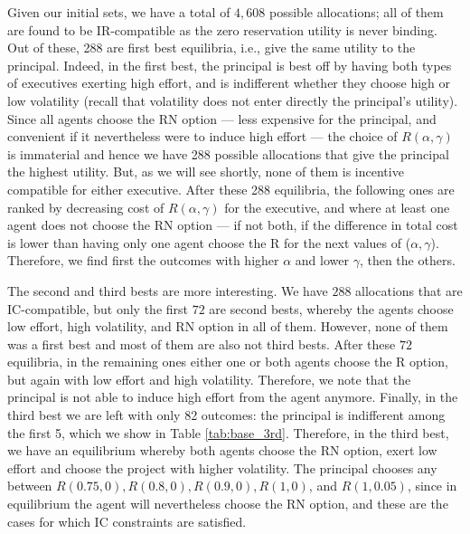 Given our initial sets, we have a total of $4,608$ possible allocations; all of them are found to be IR-compatible as the zero reservation utility is never binding. Out of these, 288 are first best equilibria, i.e., give the same utility to the principal. Indeed, in the first best, the principal is best off by having both types of executives exerting high effort, and is indifferent whether they choose high or low volatility (recall that volatility does not enter directly the principal's utility). Since all agents choose the RN option --- less expensive for the principal, and convenient if it nevertheless were to induce high effort --- the choice of $R(\alpha, \gamma)$ is immaterial and hence we have 288 possible allocations that give the principal the highest utility. But, as we will see shortly, none of them is incentive compatible for either executive. After these 288 equilibria, the following ones are ranked by decreasing cost of $R(\alpha, \gamma)$ for the executive, and where at least one agent does not choose the RN option --- if not both, if the difference in total cost is lower than having only one agent choose the R for the next values of ($\alpha, \gamma$). Therefore, we find first the outcomes with higher $\alpha$ and lower $\gamma$, then the others.



The second and third bests are more interesting. We have $288$ allocations that are IC-compatible, but only the first $72$ are second bests, whereby the agents choose low effort, high volatility, and RN option in all of them. However, none of them was a first best and most of them are also not third bests. After these $72$ equilibria, in the remaining ones either one or both agents choose the R option, but again with low effort and high volatility. Therefore, we note that the principal is not able to induce high effort from the agent anymore. Finally, in the third best we are left with only 82 outcomes: the principal is indifferent among the first 5, which we show in Table \ref*{tab:base_3rd}. Therefore, in the third best, we have an equilibrium whereby both agents choose the RN option, exert low effort and choose the project with higher volatility. The principal chooses any between $R(0.75, 0), R(0.8, 0), R(0.9, 0), R(1, 0)$, and $R(1, 0.05)$, since in equilibrium the agent will nevertheless choose the RN option, and these are the cases for which IC constraints are satisfied.



